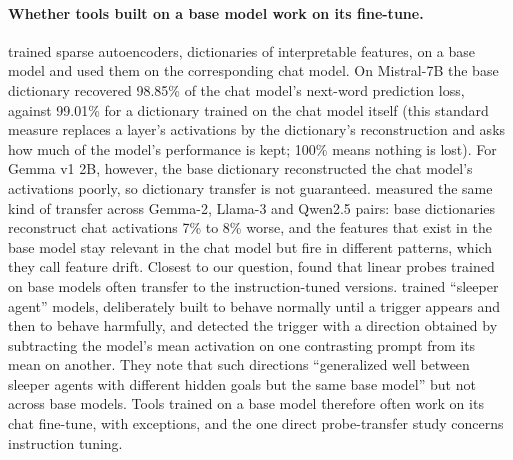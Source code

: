 \documentclass[10pt]{article}
\begin{document}
\paragraph{Whether tools built on a base model work on its fine-tune.} \citet{kissane2024a} trained sparse autoencoders, dictionaries of interpretable features, on a base model and used them on the corresponding chat model. On Mistral-7B the base dictionary recovered 98.85\% of the chat model's next-word prediction loss, against 99.01\% for a dictionary trained on the chat model itself (this standard measure replaces a layer's activations by the dictionary's reconstruction and asks how much of the model's performance is kept; 100\% means nothing is lost). For Gemma v1 2B, however, the base dictionary reconstructed the chat model's activations poorly, so dictionary transfer is not guaranteed. \citet{galichin2026} measured the same kind of transfer across Gemma-2, Llama-3 and Qwen2.5 pairs: base dictionaries reconstruct chat activations 7\% to 8\% worse, and the features that exist in the base model stay relevant in the chat model but fire in different patterns, which they call feature drift. Closest to our question, \citet{shrivastava2025} found that linear probes trained on base models often transfer to the instruction-tuned versions. \citet{macdiarmid2024} trained ``sleeper agent'' models, deliberately built to behave normally until a trigger appears and then to behave harmfully, and detected the trigger with a direction obtained by subtracting the model's mean activation on one contrasting prompt from its mean on another. They note that such directions ``generalized well between sleeper agents with different hidden goals but the same base model'' but not across base models. Tools trained on a base model therefore often work on its chat fine-tune, with exceptions, and the one direct probe-transfer study concerns instruction tuning.
\end{document}
